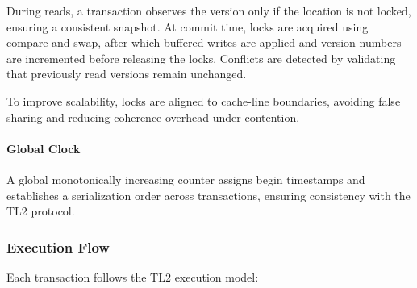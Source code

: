 \documentclass[11pt,a4paper]{article}
\begin{document}
During reads, a transaction observes the version only if the location is not locked, ensuring a consistent snapshot. At commit time, locks are acquired using compare-and-swap, after which buffered writes are applied and version numbers are incremented before releasing the locks. Conflicts are detected by validating that previously read versions remain unchanged.

To improve scalability, locks are aligned to cache-line boundaries, avoiding false sharing and reducing coherence overhead under contention.

\paragraph{Global Clock}

A global monotonically increasing counter assigns begin timestamps and establishes a serialization order across transactions, ensuring consistency with the TL2 protocol.

\subsubsection{Execution Flow}

Each transaction follows the TL2 execution model:
\end{document}
